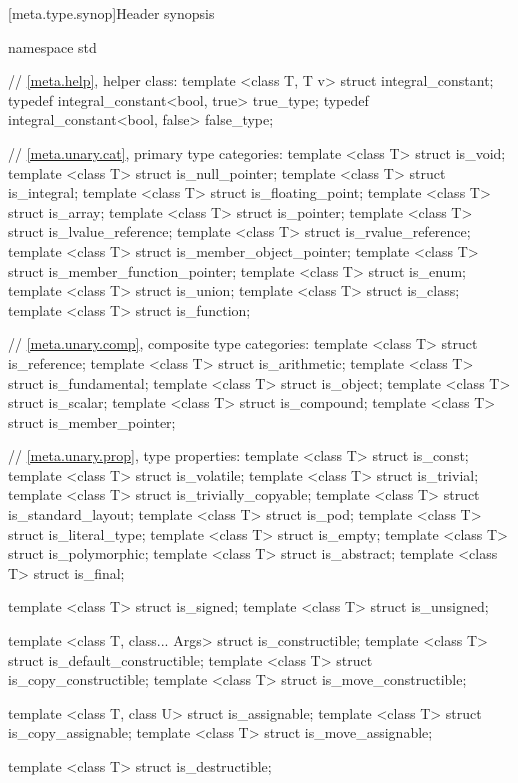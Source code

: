 [meta.type.synop]{Header  synopsis}
\begin{codeblock}
namespace std {
  // \ref{meta.help}, helper class:
  template <class T, T v> struct integral_constant;
  typedef integral_constant<bool, true>  true_type;
  typedef integral_constant<bool, false> false_type;

  // \ref{meta.unary.cat}, primary type categories:
  template <class T> struct is_void;
  template <class T> struct is_null_pointer;
  template <class T> struct is_integral;
  template <class T> struct is_floating_point;
  template <class T> struct is_array;
  template <class T> struct is_pointer;
  template <class T> struct is_lvalue_reference;
  template <class T> struct is_rvalue_reference;
  template <class T> struct is_member_object_pointer;
  template <class T> struct is_member_function_pointer;
  template <class T> struct is_enum;
  template <class T> struct is_union;
  template <class T> struct is_class;
  template <class T> struct is_function;

  // \ref{meta.unary.comp}, composite type categories:
  template <class T> struct is_reference;
  template <class T> struct is_arithmetic;
  template <class T> struct is_fundamental;
  template <class T> struct is_object;
  template <class T> struct is_scalar;
  template <class T> struct is_compound;
  template <class T> struct is_member_pointer;

  // \ref{meta.unary.prop}, type properties:
  template <class T> struct is_const;
  template <class T> struct is_volatile;
  template <class T> struct is_trivial;
  template <class T> struct is_trivially_copyable;
  template <class T> struct is_standard_layout;
  template <class T> struct is_pod;
  template <class T> struct is_literal_type;
  template <class T> struct is_empty;
  template <class T> struct is_polymorphic;
  template <class T> struct is_abstract;
  template <class T> struct is_final;

  template <class T> struct is_signed;
  template <class T> struct is_unsigned;

  template <class T, class... Args> struct is_constructible;
  template <class T> struct is_default_constructible;
  template <class T> struct is_copy_constructible;
  template <class T> struct is_move_constructible;

  template <class T, class U> struct is_assignable;
  template <class T> struct is_copy_assignable;
  template <class T> struct is_move_assignable;

  template <class T> struct is_destructible;

}
\end{codeblock}
